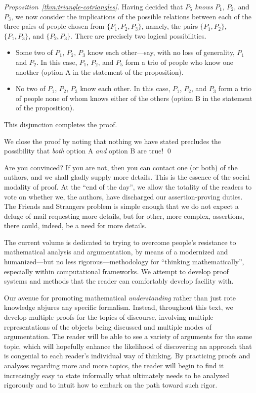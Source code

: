 \begin{proof}[Proposition~\ref{thm:triangle-cotriangles}]
\bigskip

\noindent
Having decided that $P_5$ {\em knows} $P_1$, $P_2$, and $P_3$, we now
consider the implications of the possible relations between each of
the three pairs of people chosen from $\{P_1, P_2, P_3\}$, namely, the
pairs  $\{P_1, P_2\}$, $\{P_1, P_3\}$, and $\{P_2, P_3\}$.  There
are precisely two logical possibilities.
\begin{itemize}
\item
Some two of $P_1$, $P_2$, $P_3$ know each other---say, with no loss of
generality, $P_1$ and $P_2$.  In this case, $P_1$, $P_2$, and $P_5$
form a trio of people who know one another (option A in the statement
of the proposition).
\item
No two of $P_1$, $P_2$, $P_3$ know each other.  In this case, $P_1$,
$P_2$, and $P_3$ form a trio of people none of whom knows either of
the others (option B in the statement of the proposition).
\end{itemize}
This disjunction completes the proof.

We close the proof by noting that nothing we have stated precludes the
possibility that {\em both} option A {\em and} option B are true!  \qed
\end{proof}

Are you convinced?  If you are not, then you can contact one (or both)
of the authors, and we shall gladly supply more details.  This is the
essence of the social modality of proof.  At the ``end of the day'',
we allow the totality of the readers to vote on whether we, the
authors, have discharged our assertion-proving duties.  The Friends
and Strangers problem is simple enough that we do not expect a deluge
of mail requesting more details, but for other, more complex,
assertions, there could, indeed, be a need for more details.  
\bigskip

The current volume is dedicated to trying to overcome people's
resistance to mathematical analysis and argumentation, by means of a modernized
and humanized---but no less rigorous---methodology for ``thinking
mathematically'', especially within computational frameworks.  We
attempt to develop proof systems and methods that the reader can
comfortably develop facility with.

Our avenue for promoting mathematical {\em understanding} rather than
just rote knowledge abjures any specific formalism.  Instead,
throughout this text, we develop multiple proofs for the topics of
discourse, involving multiple representations of the objects being
discussed and multiple modes of argumentation.  The reader will be
able to see a variety of arguments for the same topic, which will
hopefully enhance the likelihood of discovering an approach that is
congenial to each reader's individual way of thinking.  By practicing
proofs and analyses regarding more and more topics, the reader will
begin to find it increasingly easy to state informally what ultimately
needs to be analyzed rigorously and to intuit how to embark on the
path toward such rigor.


